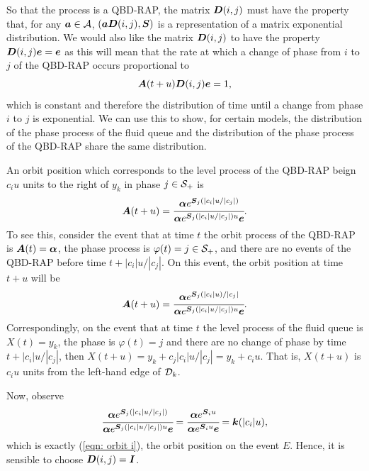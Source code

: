 So that the process is a QBD-RAP, the matrix \(\boldsymbol D(i,j)\) must have the property that, for any \(\boldsymbol a\in\mathcal A\), \((\boldsymbol a\boldsymbol D(i,j), \boldsymbol S)\) is a representation of a matrix exponential distribution. We would also like the matrix \(\boldsymbol D(i,j)\) to have the property \(\boldsymbol D(i,j) \boldsymbol e = \boldsymbol e\) as this will mean that the rate at which a change of phase from \(i\) to \(j\) of the QBD-RAP occurs proportional to 
\[\boldsymbol A(t+u) \boldsymbol D(i,j)\boldsymbol e = 1,\]
which is constant and therefore the distribution of time until a change from phase \(i\) to \(j\) is exponential. We can use this to show, for certain models, the distribution of the phase process of the fluid queue and the distribution of the phase process of the QBD-RAP share the same distribution.

An orbit position which corresponds to the level process of the QBD-RAP beign \(c_iu\) units to the right of \(y_k\) in phase \(j\in\mathcal{S}_+\) is 
\[\boldsymbol A(t+u) = \cfrac{\boldsymbol \alpha e^{\boldsymbol S_j (|c_i|u/|c_j|)}}{\boldsymbol \alpha e^{\boldsymbol S_j (|c_i|u/|c_j|) u}\boldsymbol e}.\] 
To see this, consider the event that at time \(t\) the orbit process of the QBD-RAP is \(\boldsymbol A(t) = \boldsymbol \alpha\), the phase process is \(\varphi(t) = j\in\mathcal{S}_+\), and there are no events of the QBD-RAP before time \(t+|c_i|u/|c_j|\). On this event, the orbit position at time \(t+u\) will be 
\[\displaystyle \boldsymbol A(t+u) = \cfrac{\boldsymbol \alpha e^{\boldsymbol S_j (|c_i|u)/|c_j|}}{\boldsymbol \alpha e^{\boldsymbol S_j (|c_i|u/|c_j|) u}\boldsymbol e}.\] 
Correspondingly, on the event that at time \(t\) the level process of the fluid queue is \(X(t)=y_{k}\), the phase is \(\varphi(t)=j\) and there are no change of phase by time \(t+|c_i|u/|c_j|\), then \(X(t+u)=y_{k}+c_j|c_i|u/|c_j| = y_k+c_iu\). That is, \(X(t+u)\) is \(c_iu\) units from the left-hand edge of \(\mathcal{D}_k\). 

Now, observe 
\[\cfrac{\boldsymbol \alpha e^{\boldsymbol S_j (|c_i|u/|c_j|)}}{\boldsymbol \alpha e^{\boldsymbol S_j (|c_i|u/|c_j|) u}\boldsymbol e} = \cfrac{\boldsymbol \alpha e^{\boldsymbol S_iu}}{\boldsymbol \alpha e^{\boldsymbol S_i u}\boldsymbol e} = \boldsymbol k(|c_i|u),\] 
which is exactly (\ref{eqn: orbit i}), the orbit position on the event \(E\). Hence, it is sensible to choose \(\boldsymbol D(i,j)=\boldsymbol I\). 

